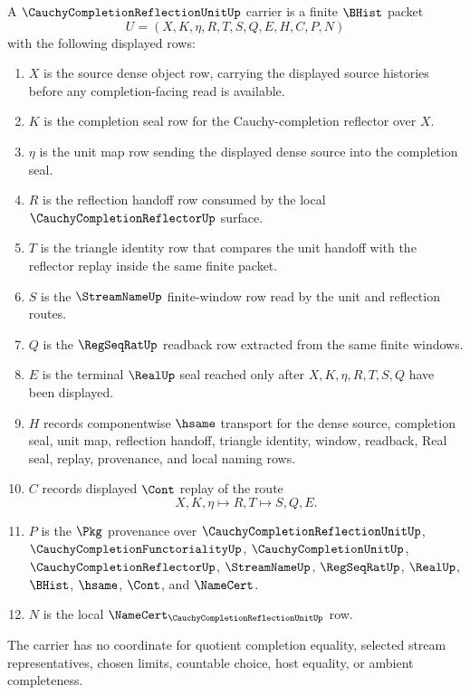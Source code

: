 \begin{definition}
\label{def:cauchy-completion-reflection-unit-carrier}
A $\CauchyCompletionReflectionUnitUp$ carrier is a finite $\BHist$ packet
$$
U=(X,K,\eta,R,T,S,Q,E,H,C,P,N)
$$
with the following displayed rows:
\begin{enumerate}
\item $X$ is the source dense object row, carrying the displayed source histories before any completion-facing read is available.
\item $K$ is the completion seal row for the Cauchy-completion reflector over $X$.
\item $\eta$ is the unit map row sending the displayed dense source into the completion seal.
\item $R$ is the reflection handoff row consumed by the local $\CauchyCompletionReflectorUp$ surface.
\item $T$ is the triangle identity row that compares the unit handoff with the reflector replay inside the same finite packet.
\item $S$ is the $\StreamNameUp$ finite-window row read by the unit and reflection routes.
\item $Q$ is the $\RegSeqRatUp$ readback row extracted from the same finite windows.
\item $E$ is the terminal $\RealUp$ seal reached only after $X,K,\eta,R,T,S,Q$ have been displayed.
\item $H$ records componentwise $\hsame$ transport for the dense source, completion seal, unit map, reflection handoff, triangle identity, window, readback, Real seal, replay, provenance, and local naming rows.
\item $C$ records displayed $\Cont$ replay of the route
$$
X,K,\eta \longmapsto R,T \longmapsto S,Q,E .
$$
\item $P$ is the $\Pkg$ provenance over $\CauchyCompletionReflectionUnitUp$, $\CauchyCompletionFunctorialityUp$, $\CauchyCompletionUnitUp$, $\CauchyCompletionReflectorUp$, $\StreamNameUp$, $\RegSeqRatUp$, $\RealUp$, $\BHist$, $\hsame$, $\Cont$, and $\NameCert$.
\item $N$ is the local $\NameCert_{\CauchyCompletionReflectionUnitUp}$ row.
\end{enumerate}
The carrier has no coordinate for quotient completion equality, selected stream representatives, chosen limits, countable choice, host equality, or ambient completeness.
\end{definition}

